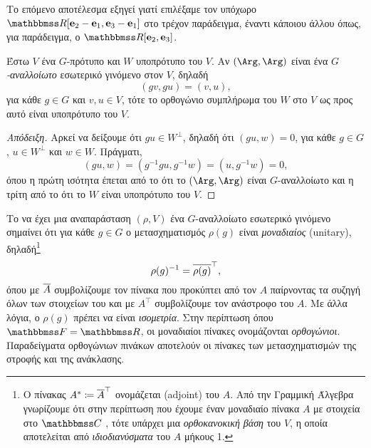 \documentclass[12pt,a4paper,reqno]{amsart}
\newcommand{\defn}[1]{{\color{mylightblue}{#1}}}
\begin{document}
Το επόμενο αποτέλεσμα εξηγεί γιατί επιλέξαμε τον υπόχωρο $\RR[\bfe_2-\bfe_1,\bfe_3-\bfe_1]$ στο τρέχον παράδειγμα, έναντι κάποιου άλλου όπως, για παράδειγμα, ο $\RR[\bfe_2,\bfe_3]$.

\begin{proposition}
    \label{prop:invariant_inner_product}
    Έστω $V$ ένα $G$-πρότυπο και $W$ υποπρότυπο του $V$. Αν $(\Arg,\Arg)$ είναι ένα \emph{$G$-αναλλοίωτο} εσωτερικό γινόμενο στον $V$, δηλαδή 
    \[
    (gv, gu) = (v,u),
    \]
    για κάθε $g \in G$ και $v, u \in V$, τότε το ορθογώνιο συμπλήρωμα του $W$ στο $V$ ως προς αυτό είναι υποπρότυπο του $V$.
\end{proposition}

\begin{proof}[Απόδειξη]
    Αρκεί να δείξουμε ότι $gu \in W^\perp$, δηλαδή ότι $(gu, w) = 0$, για κάθε $g \in G$, $u \in W^\perp$ και $w \in W$. Πράγματι, 
    \[
    (gu, w) = (g^{-1}gu, g^{-1}w) = (u, g^{-1}w) = 0,
    \]
    όπου η πρώτη ισότητα έπεται από το ότι το $(\Arg,\Arg)$ είναι $G$-αναλλοίωτο και η τρίτη από το ότι το $W$ είναι υποπρότυπο του $V$. 
\end{proof}

Το να έχει μια αναπαράσταση $(\rho, V)$ ένα $G$-αναλλοίωτο εσωτερικό γινόμενο σημαίνει ότι για κάθε $g \in G$ ο μετασχηματισμός $\rho(g)$ είναι \emph{μοναδιαίος} (unitary), δηλαδή\footnote{Ο πίνακας $A^\ast \coloneqq \overline{A}^\top$ ονομάζεται \defn{προσηρτημένος} (adjoint) του $A$. Από την Γραμμική Άλγεβρα γνωρίζουμε ότι στην περίπτωση που έχουμε έναν μοναδιαίο πίνακα $A$ με στοιχεία στο $\CC$    , τότε υπάρχει μια \emph{ορθοκανοκική βάση} του $V$, η οποία αποτελείται από \emph{ιδιοδιανύσματα} του $A$ μήκους 1.}  
\[
\rho(g)^{-1} =  \overline{\rho(g)}^\top,
\]
όπου με $\overline{A}$ συμβολίζουμε τον πίνακα που προκύπτει από τον $A$ παίρνοντας τα συζηγή όλων των στοιχείων του και με $A^\top$ συμβολίζουμε τον ανάστροφο του $A$. Με άλλα λόγια, ο $\rho(g)$ πρέπει να είναι \emph{ισομετρία}. Στην περίπτωση όπου $\FF = \RR$, οι μοναδιαίοι πίνακες ονομάζονται \emph{ορθογώνιοι}. Παραδείγματα ορθογώνιων πινάκων αποτελούν οι πίνακες των μετασχηματισμών της στροφής και της ανάκλασης.
\end{document}
